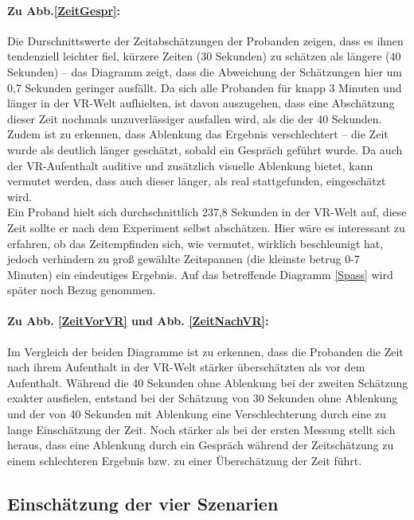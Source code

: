 \documentclass{Paper}
\begin{document}
\paragraph{Zu Abb.\ref{ZeitGespr}:} Die Durschnittswerte der Zeitabschätzungen der Probanden zeigen, dass es ihnen tendenziell leichter fiel, kürzere Zeiten (30 Sekunden) zu schätzen als längere (40 Sekunden) -- das Diagramm zeigt, dass die Abweichung der Schätzungen hier um 0,7 Sekunden geringer ausfällt. Da sich alle Probanden für knapp 3 Minuten und länger in der VR-Welt aufhielten, ist davon auszugehen, dass eine Abschätzung dieser Zeit nochmals unzuverlässiger ausfallen wird, als die der 40 Sekunden. Zudem ist zu erkennen, dass Ablenkung das Ergebnis verschlechtert -- die Zeit wurde als deutlich länger geschätzt, sobald ein Gespräch geführt wurde. Da auch der VR-Aufenthalt auditive und zusätzlich visuelle Ablenkung bietet, kann vermutet werden, dass auch dieser länger, als real stattgefunden, eingeschätzt wird.\\
Ein Proband hielt sich durchschnittlich 237,8 Sekunden in der VR-Welt auf, diese Zeit sollte er nach dem Experiment selbst abschätzen. Hier wäre es interessant zu erfahren, ob das Zeitempfinden sich, wie vermutet, wirklich beschleunigt hat, jedoch verhindern zu groß gewählte Zeitspannen (die kleinste betrug 0-7 Minuten) ein eindeutiges Ergebnis. Auf das betreffende Diagramm \ref{Spass} wird später noch Bezug genommen.

\paragraph{Zu Abb. \ref{ZeitVorVR} und Abb. \ref{ZeitNachVR}:} Im Vergleich der beiden Diagramme ist zu erkennen, dass die Probanden die Zeit nach ihrem Aufenthalt in der VR-Welt stärker überschätzten als vor dem Aufenthalt. Während die 40 Sekunden ohne Ablenkung bei der zweiten Schätzung exakter ausfielen, entstand bei der Schätzung von 30 Sekunden ohne Ablenkung und der von 40 Sekunden mit Ablenkung eine Verschlechterung durch eine zu lange Einschätzung der Zeit. Noch stärker als bei der ersten Messung stellt sich heraus, dass eine Ablenkung durch ein Gespräch während der Zeitschätzung zu einem schlechteren Ergebnis bzw. zu einer Überschätzung der Zeit führt.

\subsection{Einschätzung der vier Szenarien}
\end{document}

